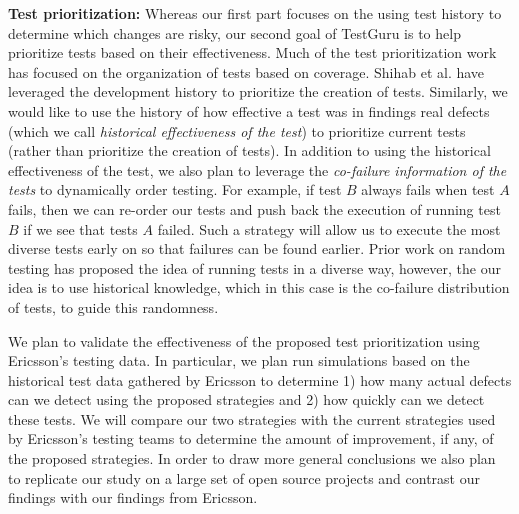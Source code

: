 \textbf{Test prioritization:} Whereas our first part focuses on the using test history to determine which changes are risky, our second goal of TestGuru is to help prioritize tests based on their effectiveness. Much of the test prioritization work  has focused on the organization of tests based on coverage.  Shihab et al. have leveraged the development history to prioritize the creation of tests. Similarly, we would like to use the history of how effective a test was in findings real defects (which we call \emph{historical effectiveness of the test}) to prioritize current tests (rather than prioritize the creation of tests). In addition to using the historical effectiveness of the test, we also plan to leverage the \emph{co-failure information of the tests} to dynamically order testing. For example, if test $B$ always fails when test $A$ fails, then we can re-order our tests and push back the execution of running test $B$ if we see that tests $A$ failed. Such a strategy will allow us to execute the most diverse tests early on so that failures can be found earlier. Prior work on random testing  has proposed the idea of running tests in a diverse way, however, the our idea is to use historical knowledge, which in this case is the co-failure distribution of tests, to guide this randomness. 

We plan to validate the effectiveness of the proposed test prioritization using Ericsson's testing data. In particular, we plan run simulations based on the historical test data gathered by Ericsson to determine 1) how many actual defects can we detect using the proposed strategies and 2) how quickly can we detect these tests. We will compare our two strategies with the current strategies used by Ericsson's testing teams to determine the amount of improvement, if any, of the proposed strategies. In order to draw more general conclusions we also plan to replicate our study on a large set of open source projects and contrast our findings with our findings from Ericsson. 


